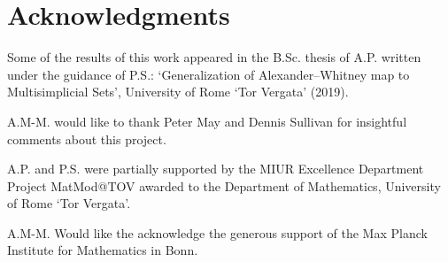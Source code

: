 
\section*{Acknowledgments}

Some of the results of this work appeared in the B.Sc. thesis of A.P. written under the guidance of P.S.: `Generalization of Alexander--Whitney map to Multisimplicial Sets', University of Rome `Tor Vergata' (2019).

A.M-M. would like to thank Peter May and Dennis Sullivan for insightful comments about this project.

A.P. and P.S. were partially supported by the MIUR Excellence Department Project MatMod@TOV awarded to the Department of Mathematics, University of Rome `Tor Vergata'.

A.M-M. Would like the acknowledge the generous support of the Max Planck Institute for Mathematics in Bonn.